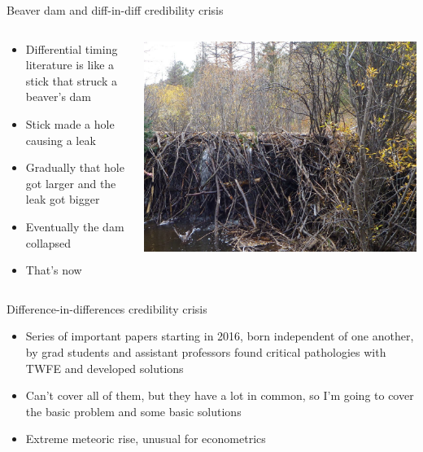 \documentclass{beamer}
\begin{document}
\begin{frame}{Beaver dam and diff-in-diff credibility crisis}
  \begin{columns}
    \begin{column}{0.5\textwidth}
      \begin{itemize}
\item Differential timing literature is like a stick that struck a beaver's dam
\item Stick made a hole causing a leak
\item Gradually that hole got larger and the leak got bigger
\item Eventually the dam collapsed 
\item That's now
      \end{itemize}
    \end{column}
    \begin{column}{0.5\textwidth}
      \includegraphics[scale=0.25]{./lecture_includes/beaverdam}
    \end{column}
  \end{columns}
\end{frame}





\begin{frame}{Difference-in-differences credibility crisis}

\begin{itemize}
\item Series of important papers starting in 2016, born independent of one another, by grad students and assistant professors found critical pathologies with TWFE and developed solutions
\item Can't cover all of them, but they have a lot in common, so I'm going to cover the basic problem and some basic solutions
\item Extreme meteoric rise, unusual for econometrics
\end{itemize}

\end{frame}
\end{document}
